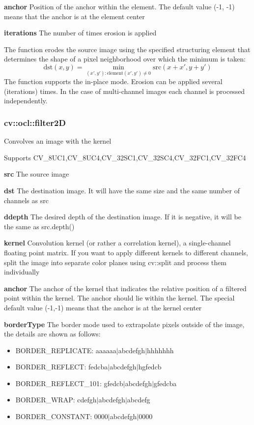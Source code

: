 \documentclass{article}
\begin{document}
\textbf{anchor }Position of the anchor within the element. The default value
(-1, -1) means that the anchor is at the element center

\textbf{iterations }The number of times erosion is applied

The function erodes the source image using the specified structuring element
that determines the shape of a pixel neighborhood over which the minimum is
taken:
\[
\mbox{dst}(x,y)=\mathop {\min
}\limits_{({x}',{y}'):\mbox{element}({x}',{y}')\ne 0}
\mbox{src}(x+{x}',y+{y}')
\]
The function supports the in-place mode. Erosion can be applied several
(iterations) times. In the case of multi-channel images each channel is
processed independently.

\newpage

\subsubsection{cv::ocl::filter2D }
\label{subsubsec:mylabel37}
Convolves an image with the kernel

Supports CV{\_}8UC1,CV{\_}8UC4,CV{\_}32SC1,CV{\_}32SC4,CV{\_}32FC1,CV{\_}32FC4

\textbf{src }The source image

\textbf{dst }The destination image. It will have the same size and the same
number of channels as src

\textbf{ddepth }The desired depth of the destination image. If it is
negative, it will be the same as src.depth()

\textbf{kernel }Convolution kernel (or rather a correlation kernel), a
single-channel floating point matrix. If you want to apply different kernels
to different channels, split the image into separate color planes using
cv::split and process them individually

\textbf{anchor }The anchor of the kernel that indicates the relative
position of a filtered point within the kernel. The anchor should lie within
the kernel. The special default value (-1,-1) means that the anchor is at
the kernel center

\textbf{borderType }The border mode used to extrapolate pixels outside of
the image, the details are shown as follows:

\begin{itemize}
\item BORDER{\_}REPLICATE: aaaaaa$\vert $abcdefgh$\vert $hhhhhhh
\item BORDER{\_}REFLECT: fedcba$\vert $abcdefgh$\vert $hgfedcb
\item BORDER{\_}REFLECT{\_}101: gfedcb$\vert $abcdefgh$\vert $gfedcba
\item BORDER{\_}WRAP: cdefgh$\vert $abcdefgh$\vert $abcdefg
\item BORDER{\_}CONSTANT: 0000$\vert $abcdefgh$\vert $0000
\end{itemize}
\end{document}
